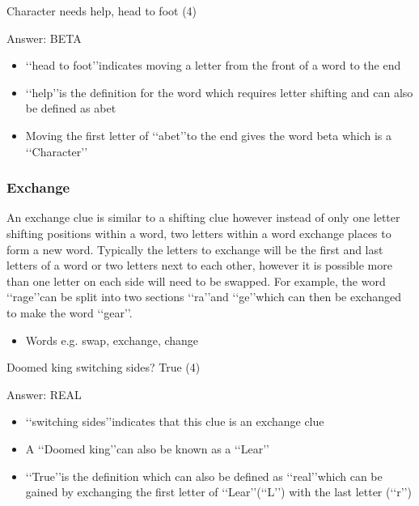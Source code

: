 
Character needs help, head to foot (4) 

Answer: BETA 

\begin{itemize}
	\item \lq\lq head to foot\rq\rq indicates moving a letter from the front of a word to the end 
	\item \lq\lq help\rq\rq is the definition for the word which requires letter shifting and can also be defined as abet 
	\item Moving the first letter of \lq\lq abet\rq\rq to the end gives the word beta which is a \lq\lq Character\rq\rq
\end{itemize}

\subsubsection{Exchange}

An exchange clue is similar to a shifting clue however instead of only one letter shifting positions within a word, two letters within a word exchange places to form a new word. Typically the letters to exchange will be the first and last letters of a word or two letters next to each other, however it is possible more than one letter on each side will need to be swapped. For example, the word \lq\lq rage\rq\rq can be split into two sections \lq\lq ra\rq\rq and \lq\lq ge\rq\rq which can then be exchanged to make the word \lq\lq gear\rq\rq.   

\begin{itemize} 
	\item Words e.g. swap, exchange, change 
\end{itemize}


Doomed king switching sides? True (4) 

Answer: REAL 

\begin{itemize}
	\item \lq\lq switching sides\rq\rq indicates that this clue is an exchange clue 
	\item A \lq\lq Doomed king\rq\rq can also be known as a \lq\lq Lear\rq\rq
	\item \lq\lq True\rq\rq is the definition which can also be defined as \lq\lq real\rq\rq which can be gained by exchanging the first letter of \lq\lq Lear\rq\rq (\lq\lq L\rq\rq) with the last letter (\lq\lq r\rq\rq) 
\end{itemize}